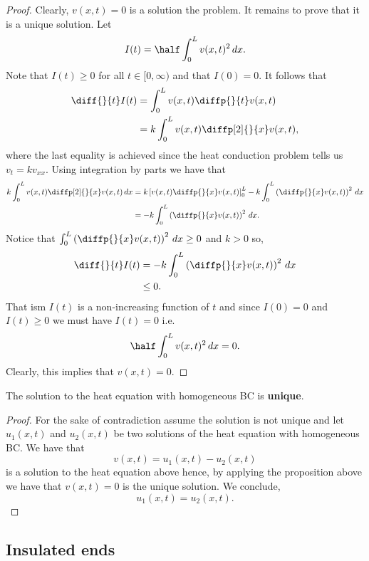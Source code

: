 \documentclass[12pt, a4paper]{article}
\begin{document}
\begin{proof}
    Clearly, \(v(x,t)=0\) is a solution the problem. It remains to prove that it is a unique solution. Let 
    \[I(t) = \half \int_{0}^{L} v(x,t)^2 \, dx.\]
    Note that \(I(t)\geq 0\) for all \(t \in [0,\infty)\) and that \(I(0) =0\). It follows that 
    \[\begin{aligned}
        \diff{}{t}I(t) &= \int_{0}^L v(x,t) \diffp{}{t}v(x,t) \\
        &= k \int_{0}^L v(x,t) \diffp[2]{}{x}v(x,t),
    \end{aligned}\]
    where the last equality is achieved since the heat conduction problem tells us \(v_t = k v_{xx}\). 
    Using integration by parts we have that 
    \[\begin{aligned}
        k \int_0^L v(x,t) \diffp[2]{}{x}v(x,t) \, dx &= k\left[ v(x,t)\diffp{}{x}v(x,t) \right]_0^L - k \int_0^L \left( \diffp{}{x} v(x,t) \right)^2 \, dx \\
        &= -k \int_{0}^{L} \left( \diffp{}{x} v(x,t) \right)^2 \, dx.
    \end{aligned}\]
    Notice that \(\int_{0}^{L} \left( \diffp{}{x} v(x,t) \right)^2 \, dx \geq 0\) and \(k>0\) so,
    \[\begin{aligned}
        \diff{}{t}I(t) &= -k\int_{0}^{L} \left( \diffp{}{x} v(x,t) \right)^2 \, dx \\
        &\leq 0.
    \end{aligned}\]
    That ism \(I(t)\) is a non-increasing function of \(t\) and since \(I(0)=0\) and \(I(t)\geq0\) we must have \(I(t)=0\) i.e.
    \[\half \int_0^L v(x,t)^2 \, dx =0.\]
    Clearly, this implies that \(v(x,t)=0\).
\end{proof}

\begin{mdthm}
    The solution to the heat equation with homogeneous BC is \textbf{unique}.
\end{mdthm}

\begin{proof}
    For the sake of contradiction assume the solution is not unique and let \(u_1(x,t)\) and \(u_2(x,t)\) be two solutions of the heat equation with homogeneous BC. We have that 
    \[v(x,t)=u_1(x,t)-u_2(x,t)\]
    is a solution to the heat equation above hence, by applying the proposition above we have that \(v(x,t)=0\) is the unique solution. We conclude,
    \[u_1(x,t)=u_2(x,t).\]
\end{proof}

\subsection{Insulated ends}
\end{document}

